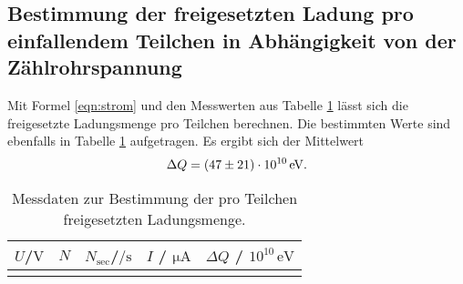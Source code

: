 \subsection{Bestimmung der freigesetzten Ladung pro einfallendem Teilchen in Abhängigkeit von der Zählrohrspannung}
Mit Formel \eqref{eqn:strom} und den Messwerten aus Tabelle \ref{tab:dtab}
lässt sich die freigesetzte Ladungsmenge pro Teilchen berechnen. Die
bestimmten Werte sind ebenfalls in Tabelle \ref{tab:dtab}
aufgetragen.
Es ergibt sich der Mittelwert
\begin{equation*}
	\Delta Q = \SI{47(21)E10}{\electronvolt} \mathrm{.}
\end{equation*}
\begin{longtable}{ccccc}
  \caption{Messdaten zur Bestimmung der pro Teilchen freigesetzten Ladungsmenge.}
	\label{tab:dtab}\\
\toprule
	$U$/$\si{\volt}$ & $N$ & $N_\mathrm{sec}$/$\si{\per\second}$ & $I$ / $\si{\micro\ampere}$ & $\Delta Q$ / $10^{10} \, \si{\electronvolt}$ \\
\midrule
\endhead
\midrule
\endfoot


\end{longtable}
